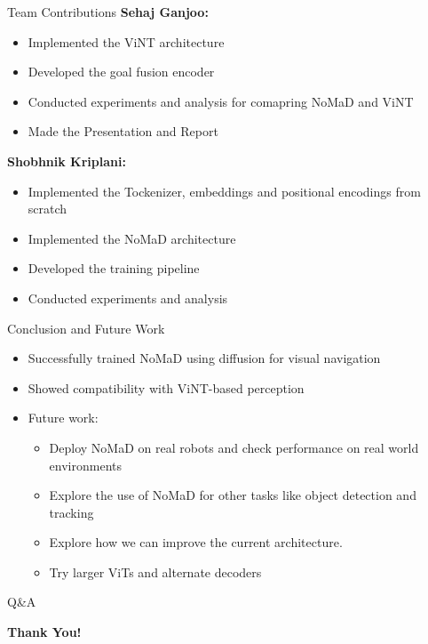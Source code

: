 \documentclass{beamer}
\begin{document}
\begin{frame}{Team Contributions}
    \textbf{Sehaj Ganjoo:} \\
    \begin{itemize}
        \item Implemented the ViNT architecture
        \item Developed the goal fusion encoder
        \item Conducted experiments and analysis for comapring NoMaD and ViNT
        \item Made the Presentation and Report
    \end{itemize}
    \textbf{Shobhnik Kriplani:} \\
    \begin{itemize}
        \item Implemented the Tockenizer, embeddings and positional encodings from scratch
        \item Implemented the NoMaD architecture
        \item Developed the training pipeline
        \item Conducted experiments and analysis
    \end{itemize}
\end{frame}

\begin{frame}{Conclusion and Future Work}
\begin{itemize}
    \item Successfully trained NoMaD using diffusion for visual navigation
    \item Showed compatibility with ViNT-based perception
    \item Future work:
    \begin{itemize}
        \item Deploy NoMaD on real robots and check performance on real world environments
        \item Explore the use of NoMaD for other tasks like object detection and tracking
        \item Explore how we can improve the current architecture.
        \item Try larger ViTs and alternate decoders
    \end{itemize}
\end{itemize}
\end{frame}

\begin{frame}{Q\&A}
    \begin{center}
        \Huge{\textbf{Thank You!}}\\
    \end{center}
\end{frame}
\end{document}
